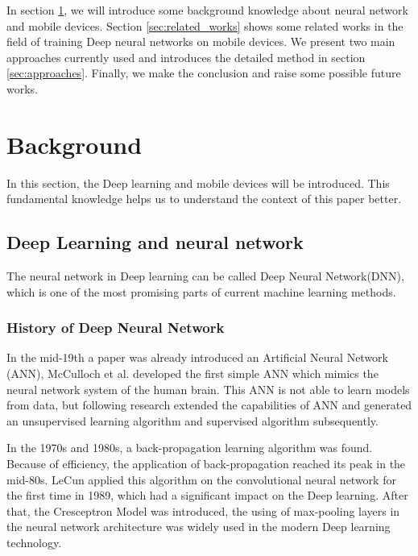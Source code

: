 \documentclass[article]{aaltoseries}
\begin{document}
In section \ref{sec:background}, we will introduce some background knowledge about neural network and mobile devices.
Section \ref{sec:related_works} shows some related works in the field of training Deep neural networks on mobile devices.
We present two main approaches currently used and introduces the detailed method in section \ref{sec:approaches}.
Finally, we make the conclusion and raise some possible future works.






\section{Background}
\label{sec:background}

In this section, the Deep learning and mobile devices will be introduced. This fundamental 
knowledge helps us to understand the context of this paper better.




\subsection{Deep Learning and neural network}

The neural network in Deep learning can be called Deep Neural Network(DNN), which is one of the most promising 
parts of current machine learning methods. 

\subsubsection{History of Deep Neural Network}

In the mid-19th a paper was already introduced an Artificial Neural Network (ANN)\cite{Warren1943}, 
McCulloch et al. developed the first simple ANN which mimics the neural network system of the human brain. This ANN is not
able to learn models from data, but following research extended the capabilities of ANN and generated an unsupervised 
learning algorithm and supervised algorithm subsequently.

In the 1970s and 1980s, a back-propagation learning algorithm was found. Because of efficiency, the application of back-propagation
reached its peak in the mid-80s. LeCun applied this algorithm on the convolutional neural network 
for the first time in 1989, which had a significant impact on the Deep learning. After that, the Cresceptron Model was introduced, 
the using of max-pooling layers in the neural network architecture was widely used in the modern Deep learning technology.
\end{document}
